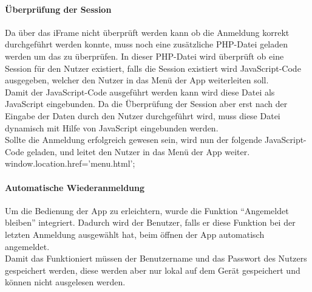 \paragraph{Überprüfung der Session\\}
	
Da über das iFrame nicht überprüft werden kann ob die Anmeldung korrekt durchgeführt werden konnte, muss noch eine zusätzliche PHP-Datei geladen werden um das zu überprüfen. In dieser PHP-Datei wird überprüft ob eine Session für den Nutzer existiert, falls die Session existiert wird JavaScript-Code ausgegeben, welcher den Nutzer in das Menü der App weiterleiten soll.\\



Damit der JavaScript-Code ausgeführt werden kann wird diese Datei als JavaScript eingebunden. Da die Überprüfung der Session aber erst nach der Eingabe der Daten durch den Nutzer durchgeführt wird, muss diese Datei dynamisch mit Hilfe von JavaScript eingebunden werden.\\



Sollte die Anmeldung erfolgreich gewesen sein, wird nun der folgende JavaScript-Code geladen, und leitet den Nutzer in das Menü der App weiter.\\

window.location.href='menu.html';

\paragraph{Automatische Wiederanmeldung\\}
	
Um die Bedienung der App zu erleichtern, wurde die Funktion \enquote{Angemeldet bleiben} integriert. Dadurch wird der Benutzer, falls er diese Funktion bei der letzten Anmeldung ausgewählt hat, beim öffnen der App automatisch angemeldet.\\

Damit das Funktioniert müssen der Benutzername und das Passwort des Nutzers gespeichert werden, diese werden aber nur lokal auf dem Gerät gespeichert und können nicht ausgelesen werden.\\

